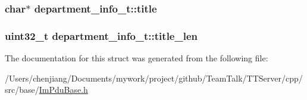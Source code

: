 \subsubsection[{title}]{\setlength{\rightskip}{0pt plus 5cm}char$\ast$ department\+\_\+info\+\_\+t\+::title}\label{structdepartment__info__t_a2ede48cd32434b5be4a0745c496fe554}
\hypertarget{structdepartment__info__t_a01cb93e68dfc1f8f8cf231bdae7479da}{}
\subsubsection[{title\+\_\+len}]{\setlength{\rightskip}{0pt plus 5cm}uint32\+\_\+t department\+\_\+info\+\_\+t\+::title\+\_\+len}\label{structdepartment__info__t_a01cb93e68dfc1f8f8cf231bdae7479da}


The documentation for this struct was generated from the following file\+:\begin{DoxyCompactItemize}
\item 
/\+Users/chenjiang/\+Documents/mywork/project/github/\+Team\+Talk/\+T\+T\+Server/cpp/src/base/\hyperlink{_im_pdu_base_8h}{Im\+Pdu\+Base.\+h}\end{DoxyCompactItemize}

